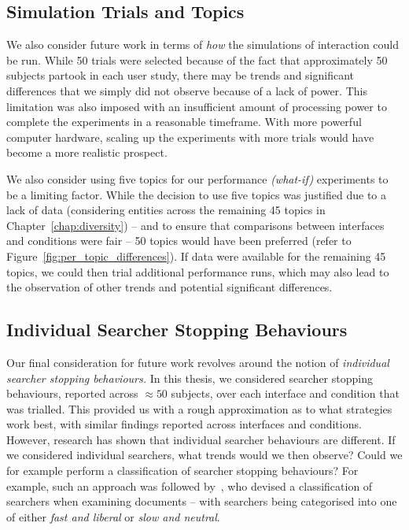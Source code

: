 \subsection{Simulation Trials and Topics}\label{sec:conclusions:future:running}
We also consider future work in terms of \emph{how} the simulations of interaction could be run. While 50 trials were selected because of the fact that approximately 50 subjects partook in each user study, there may be trends and significant differences that we simply did not observe because of a lack of power. This limitation was also imposed with an insufficient amount of processing power to complete the experiments in a reasonable timeframe. With more powerful computer hardware, scaling up the experiments with more trials would have become a more realistic prospect.

We also consider using five topics for our performance \emph{(what-if)} experiments to be a limiting factor. While the decision to use five topics was justified due to a lack of data (considering entities across the remaining 45 topics in Chapter~\ref{chap:diversity}) -- and to ensure that comparisons between interfaces and conditions were fair -- 50 topics would have been preferred (refer to Figure~\ref{fig:per_topic_differences}). If data were available for the remaining 45 topics, we could then trial additional performance runs, which may also lead to the observation of other trends and potential significant differences.

\subsection{Individual Searcher Stopping Behaviours}
Our final consideration for future work revolves around the notion of \emph{individual searcher stopping behaviours.} In this thesis, we considered searcher stopping behaviours, reported across $\approx50$ subjects, over each interface and condition that was trialled. This provided us with a rough approximation as to what strategies work best, with similar findings reported across interfaces and conditions. However, research has shown that individual searcher behaviours are different. If we considered individual searchers, what trends would we then observe? Could we for example perform a classification of searcher stopping behaviours? For example, such an approach was followed by~\cite{smucker2011user_strategies}, who devised a classification of searchers when examining documents -- with searchers being categorised into one of either \emph{fast and liberal} or \emph{slow and neutral}.

